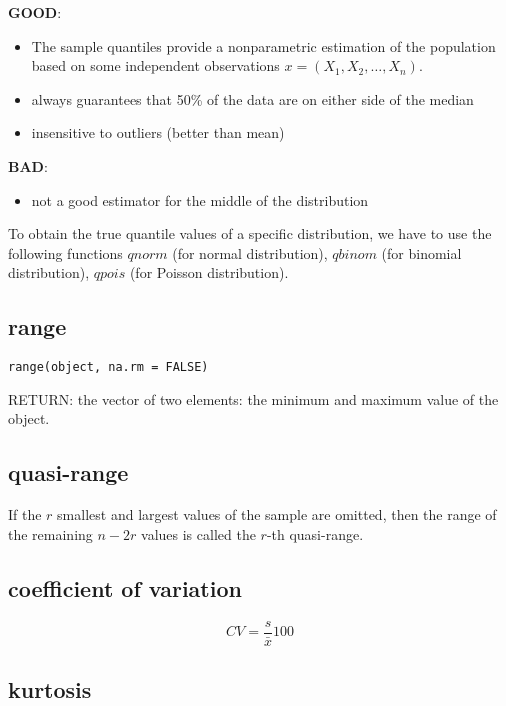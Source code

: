 {\bf GOOD}:
\begin{itemize}
\item The sample quantiles provide a nonparametric estimation of the
  population based on some independent observations $x = (X_1, X_2, …,
  X_n)$.
\item always guarantees that 50\% of the data are on either side of
  the median
\item insensitive to outliers (better than mean) 
\end{itemize}


{\bf BAD}:
\begin{itemize}
\item not a good estimator for the middle of the distribution
\end{itemize}


To obtain the true quantile values of a specific distribution, we have
to use the following functions $qnorm$ (for normal distribution),
$qbinom$ (for binomial distribution), $qpois$ (for Poisson
distribution).


\subsection{range}
\label{sec:range}

\begin{lstlisting}
range(object, na.rm = FALSE)
\end{lstlisting}
RETURN: the vector of two elements: the  minimum and maximum value of
the object.

\subsection{quasi-range}
\label{sec:quasi-range}

If the $r$ smallest and largest values of the sample are omitted, then
the range of the remaining  $n-2r$ values is called the $r$-th
quasi-range.


\subsection{coefficient of variation}
\label{sec:coeff-vari}

\begin{equation}
  \label{eq:16}
  CV = \frac{s}{\bar{x}} 100%
\end{equation}

\subsection{kurtosis}
\label{sec:kurtosis}

